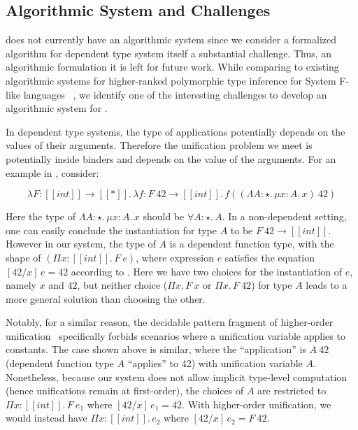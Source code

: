 \subsection{Algorithmic System and Challenges}

\name does not currently have an algorithmic system since we
consider a formalized algorithm for dependent type system itself a
substantial challenge. Thus, an algorithmic formulation it is left for future work.
While comparing to existing algorithmic systems
for higher-ranked polymorphic type inference for System F-like languages
~\citep{dunfield2013complete,zhao19mechanical},
we identify one of the interesting challenges to develop an algorithmic system for \name.

In dependent type systems, the type of applications potentially depends on the
values of their arguments.
Therefore the unification problem we meet is potentially inside binders and
depends on the value of the arguments. For an example in \name, consider:

\begin{equation*}
    \lambda F : [[int]] \rightarrow [[*]].\, \lambda f : F~42 \rightarrow [[int]].\, f ((\Lambda A : \star.\,\mu x : A.\, x)~42)
\end{equation*}

Here the type of $\Lambda A : \star.\,\mu x : A.\, x$ should be $\forall A : \star.\, A$.
In a non-dependent setting, one can easily conclude the instantiation for type $A$ to be
$F~42 \rightarrow [[int]]$. However in our system, the type of $A$ is a
dependent function type, with the shape of $(\Pi x : [[int]].\, F~e)$,
where expression $e$ satisfies the equation $[42/x]\,e = 42$ according to .
Here we have two choices for the instantiation of $e$, namely $x$ and $42$,
but neither choice ($\Pi x.\, F~x$ or $\Pi x.\, F~42$) for type $A$ leads to a more general
solution than choosing the other.

Notably, for a similar reason, the decidable pattern
fragment of higher-order unification~\citep{patternunification} specifically
forbids scenarios where a unification variable applies to constants.
The case shown above is similar, where the ``application'' is $A~42$
(dependent function type $A$ ``applies'' to 42) with unification variable $A$.
Nonetheless, because our system does not allow implicit type-level
computation (hence unifications remain at first-order),
the choices of $A$ are restricted to $\Pi x : [[int]].\,F~e_1$ where $[42/x]\,e_1 = 42$.
With higher-order unification, we would instead
have $\Pi x : [[int]].\, e_2$ where $[42/x]\,e_2 = F~42$.

